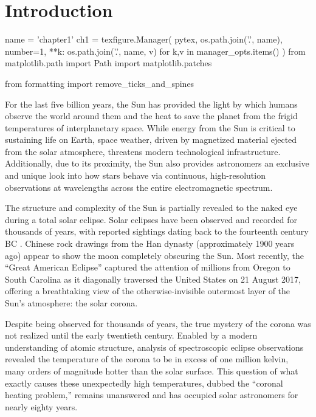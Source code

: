 \chapter{Introduction}\label{ch:introduction}
\thispagestyle{firstpageofchapterstyle}

\begin{pycode}[chapter1]
name = 'chapter1'
ch1 = texfigure.Manager(
    pytex,
    os.path.join('.', name),
    number=1,
    **{k: os.path.join('.', name, v) for k,v in manager_opts.items()}
)
from matplotlib.path import Path
import matplotlib.patches

from formatting import remove_ticks_and_spines
\end{pycode}

For the last five billion years, the Sun has provided the light by which humans observe the world around them and the heat to save the planet from the frigid temperatures of interplanetary space. While energy from the Sun is critical to sustaining life on Earth, space weather, driven by magnetized material ejected from the solar atmosphere, threatens modern technological infrastructure. Additionally, due to its proximity, the Sun also provides astronomers an exclusive and unique look into how stars behave via continuous, high-resolution observations at wavelengths across the entire electromagnetic spectrum.

The structure and complexity of the Sun is partially revealed to the naked eye during a total solar eclipse. Solar eclipses have been observed and recorded for thousands of years, with reported sightings dating back to the fourteenth century BC \citep{golub_solar_2010}. Chinese rock drawings from the Han dynasty (approximately 1900 years ago) appear to show the moon completely obscuring the Sun. Most recently, the ``Great American Eclipse'' captured the attention of millions from Oregon to South Carolina as it diagonally traversed the United States on 21 August 2017, offering a breathtaking view of the otherwise-invisible outermost layer of the Sun's atmosphere: the solar corona.

Despite being observed for thousands of years, the true mystery of the corona was not realized until the early twentieth century. Enabled by a modern understanding of atomic structure, analysis of spectroscopic eclipse observations revealed the temperature of the corona to be in excess of one million kelvin, many orders of magnitude hotter than the solar surface. This question of what exactly causes these unexpectedly high temperatures, dubbed the ``coronal heating problem,'' remains unanswered and has occupied solar astronomers for nearly eighty years. 

